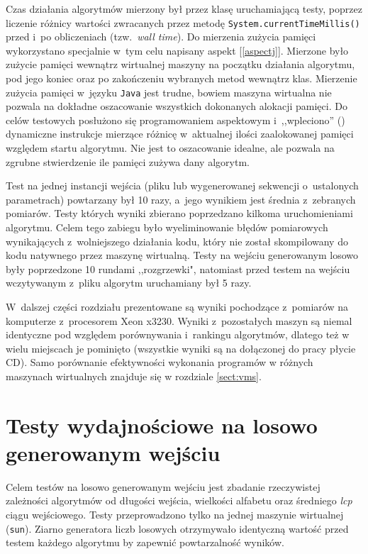 Czas działania algorytmów mierzony był przez klasę uruchamiającą testy, poprzez liczenie różnicy
wartości zwracanych przez metodę \texttt{System.currentTimeMillis()} przed i~po obliczeniach
(tzw.~\emph{wall time}). Do mierzenia zużycia pamięci wykorzystano specjalnie w~tym celu napisany
aspekt [\ref{aspectj}]. Mierzone było zużycie pamięci wewnątrz wirtualnej maszyny na początku
działania algorytmu, pod jego koniec oraz po zakończeniu wybranych metod wewnątrz klas. Mierzenie
zużycia pamięci w~języku \texttt{Java} jest trudne, bowiem maszyna wirtualna nie pozwala na dokładne
oszacowanie wszystkich dokonanych alokacji pamięci. Do celów testowych posłużono się programowaniem
aspektowym i~,,wpleciono'' () dynamiczne instrukcje mierzące różnicę
w~aktualnej ilości zaalokowanej pamięci względem startu algorytmu. Nie jest to oszacowanie idealne,
ale pozwala na zgrubne stwierdzenie ile pamięci zużywa dany algorytm.

Test na jednej instancji wejścia (pliku lub wygenerowanej sekwencji o~ustalonych parametrach)
powtarzany był 10 razy, a~jego wynikiem jest średnia z~zebranych pomiarów. Testy których wyniki
zbierano poprzedzano kilkoma uruchomieniami algorytmu. Celem tego zabiegu było wyeliminowanie błędów
pomiarowych wynikających z~wolniejszego działania kodu, który nie został skompilowany do kodu
natywnego przez maszynę wirtualną. Testy na wejściu generowanym losowo były poprzedzone 10 rundami
,,rozgrzewki", natomiast przed testem na wejściu wczytywanym z~pliku algorytm uruchamiany był 5
razy.
	
W~dalszej części rozdziału prezentowane są wyniki pochodzące z~pomiarów na komputerze z~procesorem
Xeon x3230. Wyniki z~pozostałych maszyn są niemal identyczne pod względem porównywania i~rankingu
algorytmów, dlatego też w wielu miejscach je pominięto (wszystkie wyniki są na dołączonej do pracy
płycie CD). Samo porównanie efektywności wykonania programów w różnych maszynach wirtualnych
znajduje się w rozdziale \ref{sect:vms}.


\section{Testy wydajnościowe na losowo generowanym wejściu}

Celem testów na losowo generowanym wejściu jest zbadanie rzeczywistej zależności algorytmów od
długości wejścia, wielkości alfabetu oraz średniego \emph{lcp} ciągu wejściowego. Testy
przeprowadzono tylko na jednej maszynie wirtualnej (\texttt{sun}). Ziarno generatora liczb losowych
otrzymywało identyczną wartość przed testem każdego algorytmu by zapewnić powtarzalność wyników.
	
